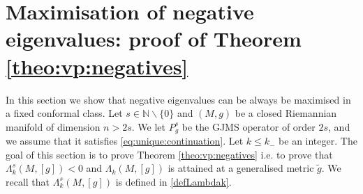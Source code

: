 \documentclass[10pt]{amsart}
\numberwithin{equation}{section}
\theoremstyle{plain}
\theoremstyle{remark}
\begin{document}
 







\section{Maximisation of negative eigenvalues: proof of Theorem \ref{theo:vp:negatives}} \label{sec:vpnegatives}

In this section we show that negative eigenvalues can be always be maximised in a fixed conformal class. Let $s \in \mathbb{N} \backslash \{0\}$ and $(M,g)$ be a closed Riemannian manifold of dimension $n > 2s$. We let $P_g^s$ be the GJMS operator of order $2s$, and we assume that it satisfies \eqref{eq:unique:continuation}. Let $k \le k_{-}$ be an integer. %
The goal of this section is to prove Theorem \ref{theo:vp:negatives} i.e. to prove that  $\Lambda_k^s(M,[g])<0$ and $\Lambda_k(M,[g])$ is attained at a generalised metric $\tilde g$. We recall that $\Lambda_k^s(M,[g])$ is defined in \eqref{defLambdak}. 
\end{document}
